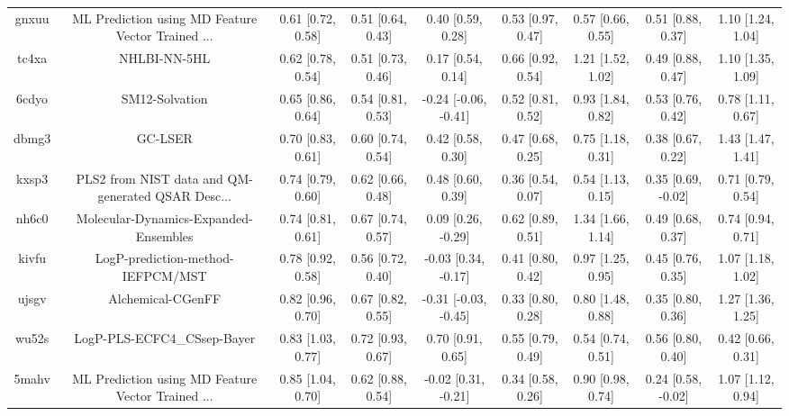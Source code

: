 \documentclass{article}
\begin{document}
\begin{center}
\begin{longtable}{|ccccccccc|}
 gnxuu &  ML Prediction using MD Feature Vector Trained ... &  0.61 [0.72, 0.58] &  0.51 [0.64, 0.43] &     0.40 [0.59, 0.28] &  0.53 [0.97, 0.47] &     0.57 [0.66, 0.55] &     0.51 [0.88, 0.37] &     1.10 [1.24, 1.04] \\
 tc4xa &                                       NHLBI-NN-5HL &  0.62 [0.78, 0.54] &  0.51 [0.73, 0.46] &     0.17 [0.54, 0.14] &  0.66 [0.92, 0.54] &     1.21 [1.52, 1.02] &     0.49 [0.88, 0.47] &     1.10 [1.35, 1.09] \\
 6cdyo &                                     SM12-Solvation &  0.65 [0.86, 0.64] &  0.54 [0.81, 0.53] &  -0.24 [-0.06, -0.41] &  0.52 [0.81, 0.52] &     0.93 [1.84, 0.82] &     0.53 [0.76, 0.42] &     0.78 [1.11, 0.67] \\
 dbmg3 &                                            GC-LSER &  0.70 [0.83, 0.61] &  0.60 [0.74, 0.54] &     0.42 [0.58, 0.30] &  0.47 [0.68, 0.25] &     0.75 [1.18, 0.31] &     0.38 [0.67, 0.22] &     1.43 [1.47, 1.41] \\
 kxsp3 &  PLS2 from NIST data and QM-generated QSAR Desc... &  0.74 [0.79, 0.60] &  0.62 [0.66, 0.48] &     0.48 [0.60, 0.39] &  0.36 [0.54, 0.07] &     0.54 [1.13, 0.15] &    0.35 [0.69, -0.02] &     0.71 [0.79, 0.54] \\
 nh6c0 &              Molecular-Dynamics-Expanded-Ensembles &  0.74 [0.81, 0.61] &  0.67 [0.74, 0.57] &    0.09 [0.26, -0.29] &  0.62 [0.89, 0.51] &     1.34 [1.66, 1.14] &     0.49 [0.68, 0.37] &     0.74 [0.94, 0.71] \\
 kivfu &                  LogP-prediction-method-IEFPCM/MST &  0.78 [0.92, 0.58] &  0.56 [0.72, 0.40] &   -0.03 [0.34, -0.17] &  0.41 [0.80, 0.42] &     0.97 [1.25, 0.95] &     0.45 [0.76, 0.35] &     1.07 [1.18, 1.02] \\
 ujsgv &                                  Alchemical-CGenFF &  0.82 [0.96, 0.70] &  0.67 [0.82, 0.55] &  -0.31 [-0.03, -0.45] &  0.33 [0.80, 0.28] &     0.80 [1.48, 0.88] &     0.35 [0.80, 0.36] &     1.27 [1.36, 1.25] \\
 wu52s &                        LogP-PLS-ECFC4\_CSsep-Bayer &  0.83 [1.03, 0.77] &  0.72 [0.93, 0.67] &     0.70 [0.91, 0.65] &  0.55 [0.79, 0.49] &     0.54 [0.74, 0.51] &     0.56 [0.80, 0.40] &     0.42 [0.66, 0.31] \\
 5mahv &  ML Prediction using MD Feature Vector Trained ... &  0.85 [1.04, 0.70] &  0.62 [0.88, 0.54] &   -0.02 [0.31, -0.21] &  0.34 [0.58, 0.26] &     0.90 [0.98, 0.74] &    0.24 [0.58, -0.02] &     1.07 [1.12, 0.94] \\

\end{longtable}
\end{center}
\end{document}
